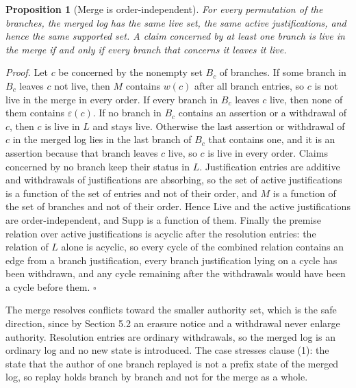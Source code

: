 \documentclass[11pt]{article}
\theoremstyle{plain}
\newtheorem{proposition}{Proposition}
\theoremstyle{definition}
\theoremstyle{remark}
\begin{document}
\begin{proposition}[Merge is order-independent]
For every permutation of the branches, the merged log has the same live set, the same active justifications, and hence the same supported set. A claim concerned by at least one branch is live in the merge if and only if every branch that concerns it leaves it live.
\end{proposition}
\emph{Proof.} Let $c$ be concerned by the nonempty set $B_c$ of branches. If some branch in $B_c$ leaves $c$ not live, then $M$ contains $w(c)$ after all branch entries, so $c$ is not live in the merge in every order. If every branch in $B_c$ leaves $c$ live, then none of them contains $\varepsilon(c)$. If no branch in $B_c$ contains an assertion or a withdrawal of $c$, then $c$ is live in $L$ and stays live. Otherwise the last assertion or withdrawal of $c$ in the merged log lies in the last branch of $B_c$ that contains one, and it is an assertion because that branch leaves $c$ live, so $c$ is live in every order. Claims concerned by no branch keep their status in $L$. Justification entries are additive and withdrawals of justifications are absorbing, so the set of active justifications is a function of the set of entries and not of their order, and $M$ is a function of the set of branches and not of their order. Hence $\mathrm{Live}$ and the active justifications are order-independent, and $\mathrm{Supp}$ is a function of them. Finally the premise relation over active justifications is acyclic after the resolution entries: the relation of $L$ alone is acyclic, so every cycle of the combined relation contains an edge from a branch justification, every branch justification lying on a cycle has been withdrawn, and any cycle remaining after the withdrawals would have been a cycle before them. \hfill$\square$

The merge resolves conflicts toward the smaller authority set, which is the safe direction, since by Section 5.2 an erasure notice and a withdrawal never enlarge authority. Resolution entries are ordinary withdrawals, so the merged log is an ordinary log and no new state is introduced. The case stresses clause (1): the state that the author of one branch replayed is not a prefix state of the merged log, so replay holds branch by branch and not for the merge as a whole.
\end{document}
